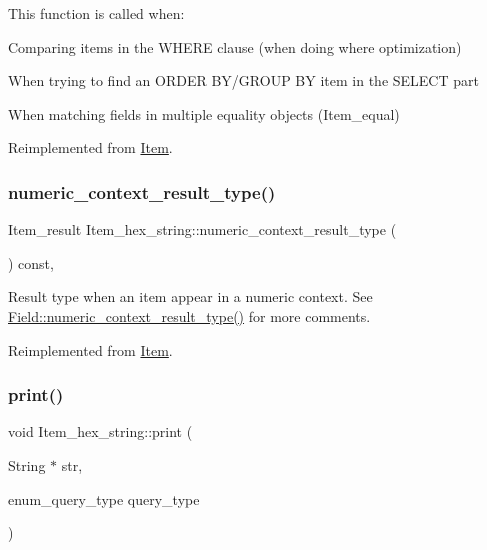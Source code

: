 This function is called when\+:
\begin{DoxyItemize}
\item Comparing items in the W\+H\+E\+RE clause (when doing where optimization)
\item When trying to find an O\+R\+D\+ER B\+Y/\+G\+R\+O\+UP BY item in the S\+E\+L\+E\+CT part
\item When matching fields in multiple equality objects (Item\+\_\+equal) 
\end{DoxyItemize}

Reimplemented from \mbox{\hyperlink{classItem_af0957bbdb9a256de0cd29f1adcae28be}{Item}}.

\mbox{\label{classItem__hex__string_af866816dabea5ef3d8316a2055ebab84}} 
\subsubsection{\texorpdfstring{numeric\+\_\+context\+\_\+result\+\_\+type()}{numeric\_context\_result\_type()}}
{\footnotesize\ttfamily Item\+\_\+result Item\+\_\+hex\+\_\+string\+::numeric\+\_\+context\+\_\+result\+\_\+type (\begin{DoxyParamCaption}{ }\end{DoxyParamCaption}) const\hspace{0.3cm}{\ttfamily [inline]}, {\ttfamily [virtual]}}

Result type when an item appear in a numeric context. See \mbox{\hyperlink{classField_a834475c74f6d0812dc4aa1abfc483a7f}{Field\+::numeric\+\_\+context\+\_\+result\+\_\+type()}} for more comments. 

Reimplemented from \mbox{\hyperlink{classItem_a0cd3592a280aa2306ea9abfeae3f632b}{Item}}.

\mbox{\label{classItem__hex__string_acb5db1d4b87cf94b16c0878d2a24616a}} 
\subsubsection{\texorpdfstring{print()}{print()}}
{\footnotesize\ttfamily void Item\+\_\+hex\+\_\+string\+::print (\begin{DoxyParamCaption}\item[{String $\ast$}]{str,  }\item[{enum\+\_\+query\+\_\+type}]{query\+\_\+type }\end{DoxyParamCaption})\hspace{0.3cm}{\ttfamily [virtual]}}

